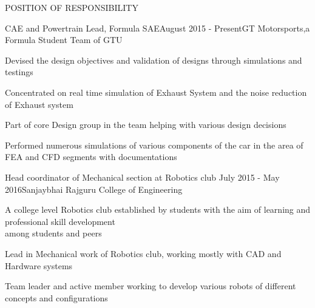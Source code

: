\documentclass{resume} %
\begin{document}
\begin{rSection}{POSITION OF RESPONSIBILITY}

\begin{rSubsection}{CAE and Powertrain Lead, Formula SAE}{August 2015 - Present}{GT Motorsports,a Formula Student Team of GTU}{}              
\item Devised the design objectives and validation of designs through simulations and testings
\item Concentrated on real time simulation of Exhaust System and the noise reduction of Exhaust system
\item Part of core Design group in the team helping with various design decisions  
\item Performed numerous simulations of various components of the car in the area of FEA and CFD segments with documentations   
\end{rSubsection}  


\begin{rSubsection}{Head coordinator of Mechanical section at Robotics club} {July 2015 - May 2016}{Sanjaybhai Rajguru College of Engineering}{} 
\item A college level Robotics club established by students with the aim of learning and professional skill development \\among students and peers            
\item Lead in Mechanical work of Robotics club, working mostly with CAD and Hardware systems
\item Team leader and active member working to develop various robots of different concepts and configurations     
\end{rSubsection}

\end{rSection}
  



 
\end{document}
